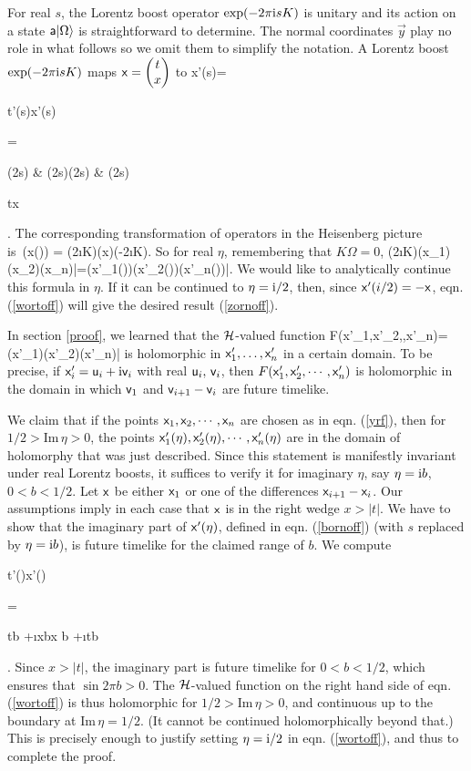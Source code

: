 \documentclass[12pt]{article}
\def\x{{\sf x}}
\def\a{{\sf a}}
\def\ra{\rangle}
\def\bp{\begin{pmatrix}}
\def\ep{\end{pmatrix}}
\numberwithin{equation}{section}
\def\u{{\sf u}}
\def\v{{\sf v}}
\begin{document}
For real $s$, the Lorentz boost operator $\exp(-2\pi {\mathrm i} s K)$ is unitary and its action on a state $\a|\Omega\ra$ is straightforward to determine.
The normal coordinates $\vec y$ play no role in what follows so we omit them to simplify the notation. 
A Lorentz boost $\exp(-2\pi{\mathrm i} s K)$ maps $\x =\bp t\cr x\ep$ to 
\be\label{bornoff}\x'(s)=\bp t'(s)\cr x'(s)\cr\ep = \bp \cosh(2\pi s) & \sinh (2\pi s)\cr \sinh(2\pi s) & \cosh(2\pi  s)\ep \bp t\cr x\ep .\ee
The corresponding transformation of operators in the Heisenberg picture is\
 \be\label{gerf}\phi(\x(\eta)) = \exp(2\pi \i\eta K)\phi(\x)\exp(-2\pi \i\eta K).\ee
So for real $\eta$, remembering that $K\Omega=0$,
\be\label{wortoff} \exp(2\pi \i \eta K)\phi(\x_1)\phi(\x_2)\cdots \phi(\x_n)|\Omega\ra =\phi(\x'_1(\eta))\phi(\x'_2(\eta))\cdots \phi(\x'_n(\eta))|\Omega\ra. \ee
We would like to analytically continue this formula in $\eta$.  If it can be continued to $\eta={\mathrm i}/2$, then, since 
$\x'(i/2)=-\x$, eqn. (\ref{wortoff}) will give the desired result (\ref{zornoff}).

In section \ref{proof}, we learned that the ${\mathcal H}$-valued function 
\be\label{stav} F(\x'_1,\x'_2,\cdots,\x'_n)=\phi(\x'_1)\phi(\x'_2)\cdots \phi(\x'_n)|\Omega \ra\ee
is holomorphic in $\x'_1,\dots,\x'_n$ in a certain domain. To be precise,
if $\x'_i=\u_i+\i \v_i$ with real $\u_i, \,\v_i$, then $F(\x'_1,\x'_2,\cdots,
\x'_n)$ is holomorphic in the domain in which $\v_1$ and $\v_{i+1}-\v_i$ are future timelike.    

We claim that if the points $\x_1,\x_2,\cdots,\x_n$ are chosen as in eqn. (\ref{yrf}), then for $1/2>\mathrm{Im}\,\eta>0$, the points $\x'_1(\eta),\x'_2(\eta),\cdots,\x'_n(\eta)$ are in the domain of
holomorphy that was just described.  Since this statement is manifestly invariant
under real Lorentz boosts, it suffices to verify it for imaginary $\eta$, say $\eta={\mathrm i} b$, $0<b<1/2$.  Let $\x$ be either $\x_1$ or one of the
  differences 
$\x_{i+1}-\x_i$.   Our assumptions imply in each case that $\x$ is in the right wedge $x>|t|$. We have to show
that  the imaginary part of $\x'(\eta)$, defined in eqn. (\ref{bornoff}) (with $s$ replaced by $\eta={\mathrm i} b$),
is future timelike for the claimed range of $b$.   We compute
\be\label{zoffo} \bp t'(\eta)\cr x'(\eta)\ep=\bp t\pi b +\i x\pi b\cr x \pi b +\i t\pi b\, \ep.\ee
Since $x>|t|$, the imaginary part is future timelike for $0<b
<1/2$, which ensures that $\sin 2\pi b>0$. The ${\mathcal H}$-valued function
on the right hand side of eqn. (\ref{wortoff}) is thus holomorphic for $1/2>\mathrm{Im}\,\eta>0$, and continuous up to the boundary at $\mathrm
{Im}\,\eta=1/2$. (It cannot be continued
holomorphically beyond that.)   This is precisely enough to justify setting $\eta={\mathrm i}/2$ in eqn. (\ref{wortoff}), and thus to complete the proof.
\end{document}
